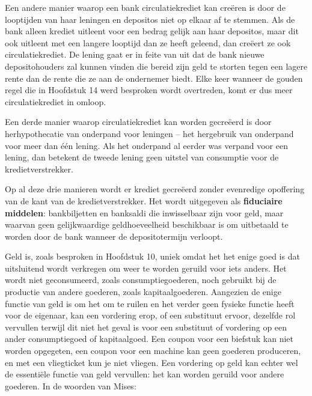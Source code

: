 Een andere manier waarop een bank circulatiekrediet kan creëren is door de looptijden van haar leningen en deposito\textquotesingle s niet op elkaar af te stemmen. Als de bank alleen krediet uitleent voor een bedrag gelijk aan haar deposito\textquotesingle s, maar dit ook uitleent met een langere looptijd dan ze heeft geleend, dan creëert ze ook circulatiekrediet. De lening gaat er in feite van uit dat de bank nieuwe depositohouders zal kunnen vinden die bereid zijn geld te storten tegen een lagere rente dan de rente die ze aan de ondernemer biedt. Elke keer wanneer de gouden regel die in Hoofdstuk 14 werd besproken wordt overtreden, komt er dus meer circulatiekrediet in omloop.

Een derde manier waarop circulatiekrediet kan worden gecreëerd is door herhypothecatie van onderpand voor leningen -- het hergebruik van onderpand voor meer dan één lening. Als het onderpand al eerder was verpand voor een lening, dan betekent de tweede lening geen uitstel van consumptie voor de kredietverstrekker.

Op al deze drie manieren wordt er krediet gecreëerd zonder evenredige opoffering van de kant van de kredietverstrekker. Het wordt uitgegeven als \textbf{fiduciaire middelen}: bankbiljetten en banksaldi die inwisselbaar zijn voor geld, maar waarvan geen gelijkwaardige geldhoeveelheid beschikbaar is om uitbetaald te worden door de bank wanneer de depositotermijn verloopt.

Geld is, zoals besproken in Hoofdstuk 10, uniek omdat het het enige goed is dat uitsluitend wordt verkregen om weer te worden geruild voor iets anders. Het wordt niet geconsumeerd, zoals consumptiegoederen, noch gebruikt bij de productie van andere goederen, zoals kapitaalgoederen. Aangezien de enige functie van geld is om het om te ruilen en het verder geen fysieke functie heeft voor de eigenaar, kan een vordering erop, of een substituut ervoor, dezelfde rol vervullen terwijl dit niet het geval is voor een substituut of vordering op een ander consumptiegoed of kapitaalgoed. Een coupon voor een biefstuk kan niet worden opgegeten, een coupon voor een machine kan geen goederen produceren, en met een vliegticket kun je niet vliegen. Een vordering op geld kan echter wel de essentiële functie van geld vervullen: het kan worden geruild voor andere goederen. In de woorden van Mises:

